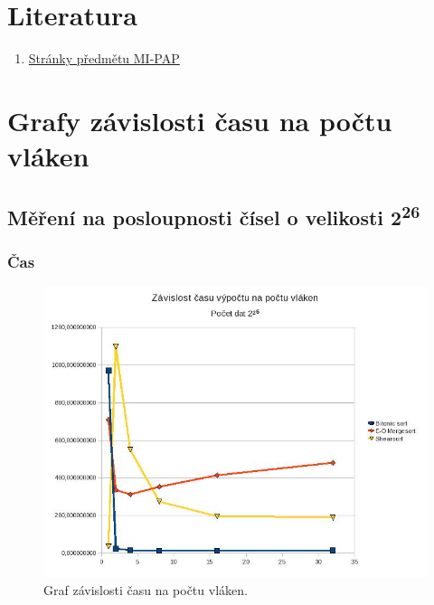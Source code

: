 \documentclass[12pt]{article}
\begin{document}
\section{Literatura}
\begin{enumerate}
\item \href{https://edux.fit.cvut.cz/courses/MI-PAP}{Stránky předmětu MI-PAP}
\end{enumerate}


\appendix
\section{Grafy závislosti času na počtu vláken}

\subsection{Měření na posloupnosti čísel o velikosti 2\textsuperscript{26}}
\subsubsection{Čas}
\begin{figure}[H]
\begin{center}
\includegraphics[width=14cm]{mereni.jpg}
\caption{Graf závislosti času na počtu vláken.}
\label{fig:testAinfib}
\end{center}
\end{figure}
\end{document}
